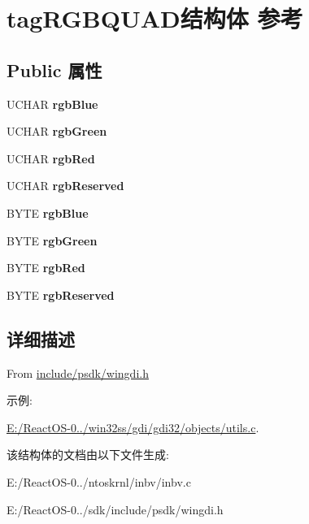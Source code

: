 \hypertarget{structtag_r_g_b_q_u_a_d}{}\section{tag\+R\+G\+B\+Q\+U\+A\+D结构体 参考}
\label{structtag_r_g_b_q_u_a_d}
\subsection*{Public 属性}
\begin{DoxyCompactItemize}
\item 
\mbox{\label{structtag_r_g_b_q_u_a_d_a30a0b864021c2c4f951cf77aa97c5991}} 
U\+C\+H\+AR {\bfseries rgb\+Blue}
\item 
\mbox{\label{structtag_r_g_b_q_u_a_d_a99a258bbad563f6375b96d56c7a437a9}} 
U\+C\+H\+AR {\bfseries rgb\+Green}
\item 
\mbox{\label{structtag_r_g_b_q_u_a_d_a3faac682a955206aff2c225ef18c75c5}} 
U\+C\+H\+AR {\bfseries rgb\+Red}
\item 
\mbox{\label{structtag_r_g_b_q_u_a_d_a14f5dc403779ad1123ec58a461839308}} 
U\+C\+H\+AR {\bfseries rgb\+Reserved}
\item 
\mbox{\label{structtag_r_g_b_q_u_a_d_ad99c50770a73c6fae3ee1ea627da1c60}} 
B\+Y\+TE {\bfseries rgb\+Blue}
\item 
\mbox{\label{structtag_r_g_b_q_u_a_d_a4dae0a7db2f4d432cb4da3de4ef337bd}} 
B\+Y\+TE {\bfseries rgb\+Green}
\item 
\mbox{\label{structtag_r_g_b_q_u_a_d_aa143fcd3ff08a04b152bee9d410821a6}} 
B\+Y\+TE {\bfseries rgb\+Red}
\item 
\mbox{\label{structtag_r_g_b_q_u_a_d_a2758aec56e37d4f3f5fde511a58f4f82}} 
B\+Y\+TE {\bfseries rgb\+Reserved}
\end{DoxyCompactItemize}


\subsection{详细描述}
From \hyperlink{wingdi_8h_source}{include/psdk/wingdi.\+h} \begin{Desc}
\item[示例\+: ]\par
\hyperlink{_e_1_2_react_o_s-0_84_86_2win32ss_2gdi_2gdi32_2objects_2utils_8c-example}{E\+:/\+React\+O\+S-\/0../win32ss/gdi/gdi32/objects/utils.\+c}.\end{Desc}


该结构体的文档由以下文件生成\+:\begin{DoxyCompactItemize}
\item 
E\+:/\+React\+O\+S-\/0../ntoskrnl/inbv/inbv.\+c\item 
E\+:/\+React\+O\+S-\/0../sdk/include/psdk/wingdi.\+h\end{DoxyCompactItemize}
